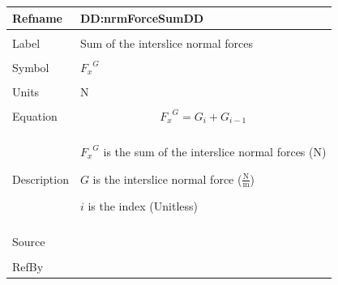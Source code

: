 \documentclass[12pt]{article}
\begin{document}
\noindent \begin{minipage}{\textwidth}
\begin{tabular}{p{} p{}}
\toprule \textbf{Refname} & \textbf{DD:nrmForceSumDD}
\label{DD:nrmForceSumDD}
\\ \midrule \\
Label & Sum of the interslice normal forces
        \\ \midrule \\
        Symbol & ${{F_{x}}^{G}}$
                 \\ \midrule \\
                 Units & N
                         \\ \midrule \\
                         Equation & \begin{displaymath}
                                    {{F_{x}}^{G}}=G_{i}+G_{i-1}
                                    \end{displaymath}
                                    \\ \midrule \\
                                    Description & \begin{symbDescription}
                                                  \item{${{F_{x}}^{G}}$ is the sum of the interslice normal forces (N)}
                                                  \item{$G$ is the interslice normal force ($\frac{\text{N}}{\text{m}}$)}
                                                  \item{$i$ is the index (Unitless)}
                                                  \end{symbDescription}
                                                  \\ \midrule \\
                                                  Source & \\ \midrule \\
                                                           RefBy & 
\\ \bottomrule \end{tabular}
\end{minipage}
\par~
\end{document}
